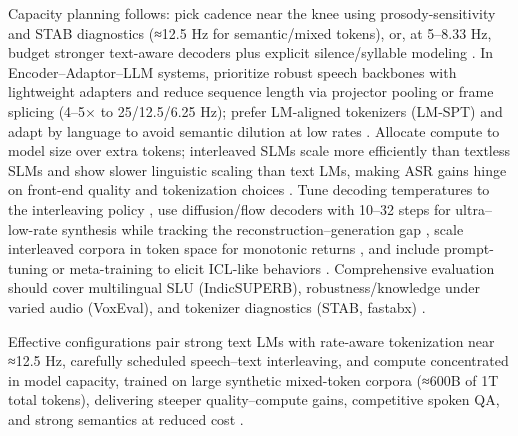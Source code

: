 \documentclass{article}
\begin{document}
Capacity planning follows: pick cadence near the knee using prosody-sensitivity and STAB diagnostics (≈12.5 Hz for semantic/mixed tokens), or, at 5–8.33 Hz, budget stronger text-aware decoders plus explicit silence/syllable modeling \cite{vashishth2024stabspeechtokenizerassessmentbenchmark,onda2025benchmarkingprosodyencodingdiscretespeec}. In Encoder–Adaptor–LLM systems, prioritize robust speech backbones with lightweight adapters and reduce sequence length via projector pooling or frame splicing (4–5× to 25/12.5/6.25 Hz); prefer LM-aligned tokenizers (LM‑SPT) and adapt by language to avoid semantic dilution at low rates \cite{wang2023slmbridgethingapbetweenspeechtextfoundat,jo2025lmsptalignedsemanticdistillationspeechto,zhang2025impactframeratesspeechtokenizercasestudy}. Allocate compute to model size over extra tokens; interleaved SLMs scale more efficiently than textless SLMs and show slower linguistic scaling than text LMs, making ASR gains hinge on front-end quality and tokenization choices \cite{cuervo2024scalingpropertiesspeechlanguagemodels,turetzky2024lastlanguagemodelawarespeechtokenization,kando2025exploringeffectsegmentationvocabularysiz,maimon2025scalinganalysisinterleavedspeechtextlang,zeng2024scalingspeechtextpretrainingsyntheticint}. Tune decoding temperatures to the interleaving policy \cite{cui2025thinkbeforeyoutalkenhancingmeaningfuldia}, use diffusion/flow decoders with 10–32 steps for ultra–low-rate synthesis while tracking the reconstruction–generation gap \cite{wang2025tadicodectextawarediffusionspeechtokeniz}, scale interleaved corpora in token space for monotonic returns \cite{zeng2024scalingspeechtextpretrainingsyntheticint}, and include prompt-tuning or meta-training to elicit ICL-like behaviors \cite{hsu2024exploringcontextlearningtextlessspeechla}. Comprehensive evaluation should cover multilingual SLU (IndicSUPERB), robustness/knowledge under varied audio (VoxEval), and tokenizer diagnostics (STAB, fastabx) \cite{entry2025indicsuperbspeechprocessinguniversalperf,cui2025voxevalbenchmarkingknowledgeunderstandin,vashishth2024stabspeechtokenizerassessmentbenchmark,poli2025fastabxlibraryefficientcomputationabxdis}.

Effective configurations pair strong text LMs with rate-aware tokenization near ≈12.5 Hz, carefully scheduled speech–text interleaving, and compute concentrated in model capacity, trained on large synthetic mixed-token corpora (≈600B of 1T total tokens), delivering steeper quality–compute gains, competitive spoken QA, and strong semantics at reduced cost \cite{maimon2025scalinganalysisinterleavedspeechtextlang,zhang2024speechtokenizerunifiedspeechtokenizerlar,zeng2024scalingspeechtextpretrainingsyntheticint,cuervo2024scalingpropertiesspeechlanguagemodels}.
\end{document}
